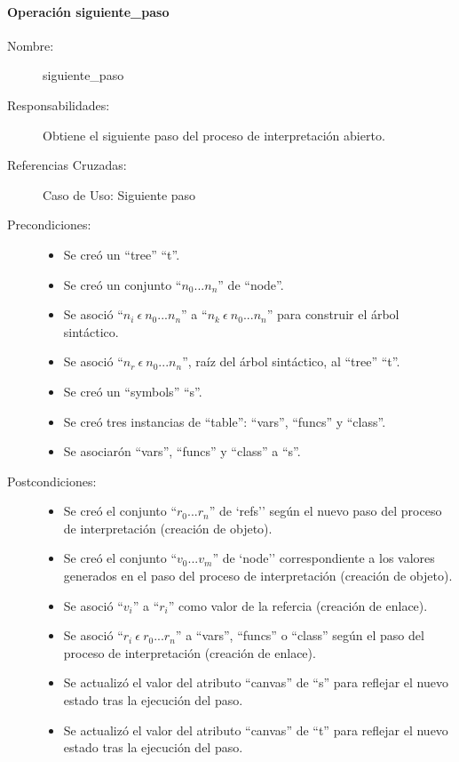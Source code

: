 \paragraph{Operación siguiente\_paso}
\FloatBarrier
\begin{framed}
	\begin{description}
		\item [Nombre:] siguiente\_paso
		\item [Responsabilidades:] Obtiene el siguiente paso del proceso de interpretación abierto.
		\item [Referencias Cruzadas: ] Caso de Uso: Siguiente paso
      \item [Precondiciones:] \hfill
         \begin {itemize}
         \item Se creó un ``tree'' ``t''.
         \item Se creó un conjunto ``$n_0...n_n$'' de ``node''.
         \item Se asoció ``$n_i\ \epsilon\ n_0...n_n$'' a ``$n_k\ \epsilon\ n_0...n_n$'' para construir el árbol sintáctico.
         \item Se asoció  ``$n_r\ \epsilon\ n_0...n_n$'', raíz del árbol sintáctico, al ``tree'' ``t''.
         \item Se creó un ``symbols'' ``s''.
         \item Se creó tres instancias de ``table'': ``vars'', ``funcs'' y ``class''.
         \item Se asociarón ``vars'', ``funcs'' y ``class'' a ``s''.
      \end{itemize}
      \item [Postcondiciones:] \hfill
      \begin {itemize}
         \item Se creó el conjunto ``$r_0...r_n$'' de `refs'' según el nuevo paso del proceso de interpretación (creación de objeto).
         \item Se creó el conjunto ``$v_0...v_m$'' de `node'' correspondiente a los valores generados en el paso del proceso de interpretación (creación de objeto).
         \item Se asoció ``$v_i$'' a ``$r_i$'' como valor de la refercia (creación de enlace).
         \item Se asoció ``$r_i\ \epsilon \ r_0...r_n$'' a ``vars'', ``funcs'' o ``class'' según el paso del proceso de interpretación (creación de enlace).  
         \item Se actualizó el valor del atributo ``canvas'' de ``s'' para reflejar el nuevo estado tras la ejecución del paso.
         \item Se actualizó el valor del atributo ``canvas'' de ``t'' para reflejar el nuevo estado tras la ejecución del paso.
      \end{itemize}
	\end{description}
\end{framed}
\FloatBarrier

